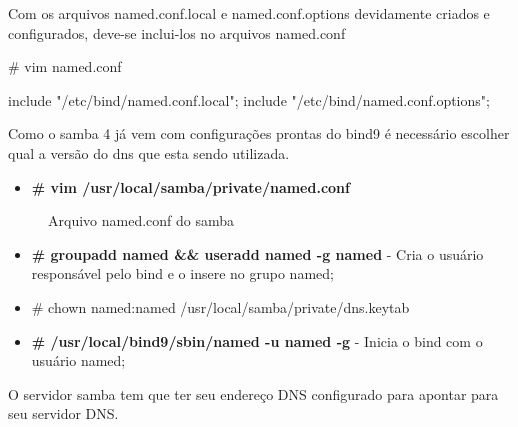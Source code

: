 Com os arquivos named.conf.local e named.conf.options devidamente criados e configurados, deve-se inclui-los no arquivos named.conf

\# vim named.conf

include "/etc/bind/named.conf.local";
include "/etc/bind/named.conf.options";


Como o samba 4 já vem com configurações prontas do bind9 é necessário escolher qual a versão do dns que esta sendo utilizada.

\begin{itemize}
	\item \textbf{\# vim /usr/local/samba/private/named.conf}
\end{itemize}

\begin{figure}[ht]
   	\centering
   	\caption{Arquivo named.conf do samba}
    \label{cups}
\end{figure}

% 
% 
% 
% 

\begin{itemize}
	\item \textbf{\# groupadd named \&\& useradd named -g named} - Cria o usuário responsável pelo bind e o insere no grupo named;
	\item{\# chown named:named /usr/local/samba/private/dns.keytab}
	\item \textbf{\# /usr/local/bind9/sbin/named -u named -g} - Inicia o bind com o usuário named;
\end{itemize}

O servidor samba tem que ter seu endereço DNS configurado para apontar para seu servidor DNS.

